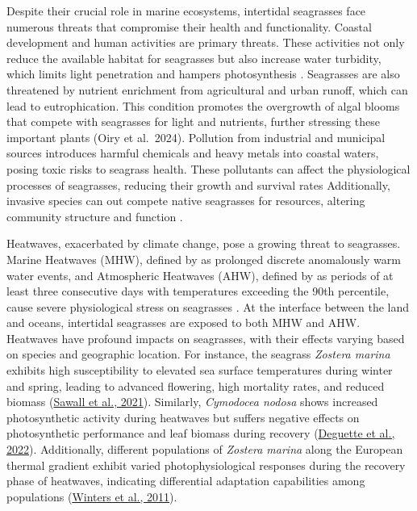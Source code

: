 \documentclass[
  number]{elsarticle}
\begin{document}
Despite their crucial role in marine ecosystems, intertidal seagrasses
face numerous threats that compromise their health and functionality.
Coastal development and human activities are primary threats. These
activities not only reduce the available habitat for seagrasses but also
increase water turbidity, which limits light penetration and hampers
photosynthesis \citep{waycott2009accelerating}. Seagrasses are also
threatened by nutrient enrichment from agricultural and urban runoff,
which can lead to eutrophication. This condition promotes the overgrowth
of algal blooms that compete with seagrasses for light and nutrients,
further stressing these important plants \citep{thomsen2023meadow} (Oiry
et al.~2024). Pollution from industrial and municipal sources introduces
harmful chemicals and heavy metals into coastal waters, posing toxic
risks to seagrass health. These pollutants can affect the physiological
processes of seagrasses, reducing their growth and survival rates
\citep{sevgi2022bitkilerde} Additionally, invasive species can out
compete native seagrasses for resources, altering community structure
and function \citep{simpson2016distribution}.

Heatwaves, exacerbated by climate change, pose a growing threat to
seagrasses. Marine Heatwaves (MHW), defined by
\citep{hobday2016hierarchical} as prolonged discrete anomalously warm
water events, and Atmospheric Heatwaves (AHW), defined by
\citep{perkins2013measurement} as periods of at least three consecutive
days with temperatures exceeding the 90th percentile, cause severe
physiological stress on seagrasses
\citep{sawall2021chronically, deguette2022physiological}. At the
interface between the land and oceans, intertidal seagrasses are exposed
to both MHW and AHW. Heatwaves have profound impacts on seagrasses, with
their effects varying based on species and geographic location. For
instance, the seagrass \emph{Zostera marina} exhibits high
susceptibility to elevated sea surface temperatures during winter and
spring, leading to advanced flowering, high mortality rates, and reduced
biomass (\href{https://dx.doi.org/10.1002/lno.11947}{Sawall et al.,
2021}). Similarly, \emph{Cymodocea nodosa} shows increased
photosynthetic activity during heatwaves but suffers negative effects on
photosynthetic performance and leaf biomass during recovery
(\href{https://dx.doi.org/10.1038/s41598-022-12102-x}{Deguette et al.,
2022}). Additionally, different populations of \emph{Zostera marina}
along the European thermal gradient exhibit varied photophysiological
responses during the recovery phase of heatwaves, indicating
differential adaptation capabilities among populations
(\href{https://dx.doi.org/10.3354/MEPS09213}{Winters et al., 2011}).
\end{document}
